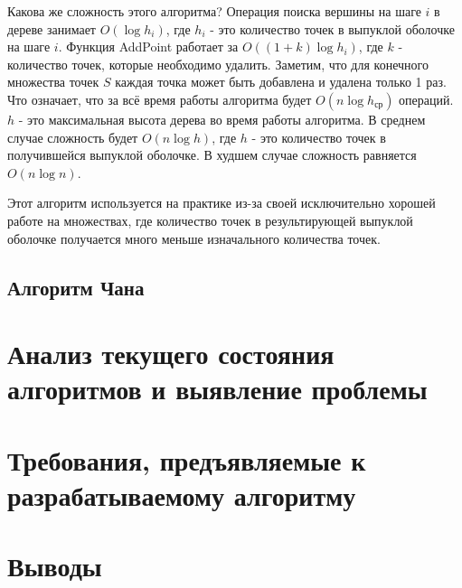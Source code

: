 Какова же сложность этого алгоритма? Операция поиска вершины на шаге $i$ в дереве занимает $O(\log h_i)$, где $h_i$ - это количество точек в выпуклой оболочке на шаге $i$. Функция AddPoint работает за $O((1+k) \log h_i)$, где $k$ - количество точек, которые необходимо удалить. Заметим, что для конечного множества точек $S$ каждая точка может быть добавлена и удалена только 1 раз. Что означает, что за всё время работы алгоритма будет $O(n \log h_{ср})$ операций. $h$ - это максимальная высота дерева во время работы алгоритма. В среднем случае сложность будет $O(n \log h)$, где $h$ - это количество точек в получившейся выпуклой оболочке. В худшем случае сложность равняется $O(n \log n)$.

Этот алгоритм используется на практике из-за своей исключительно хорошей работе на множествах, где количество точек в результирующей выпуклой оболочке получается много меньше изначального количества точек.

\subsection{Алгоритм Чана} \label{subsect1_1_6}

\section{Анализ текущего состояния алгоритмов и выявление проблемы} \label{sect1_2}

\section{Требования, предъявляемые к разрабатываемому алгоритму} \label{sect1_3}


\section{Выводы} \label{subsect1_4}




